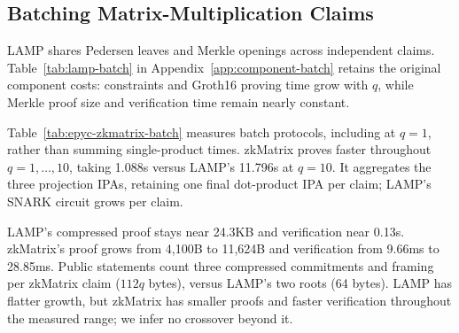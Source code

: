 \documentclass[conference,compsoc]{IEEEtran}
\makeatletter
\newif\ifshowrevisions
\newenvironment{revblock}[1][]
  {%
    \ifshowrevisions
      \begin{tcolorbox}[
        breakable,
        colback=revisionyellow,
        colframe=revisionyellow,
        boxrule=0pt,
        arc=0pt,
        left=2pt,
        right=2pt,
        top=2pt,
        bottom=2pt,
        before skip=2pt,
        after skip=2pt,
        #1
      ]
    \fi
  }
  {%
    \ifshowrevisions
      \end{tcolorbox}
    \fi
  }
\newcommand{\mat}{\mathbf}          %
\theoremstyle{plain}
\theoremstyle{definition}
\theoremstyle{remark}
\providecommand{\DIFaddtex}[1]{{\protect\color{blue}\uwave{#1}}} %
\providecommand{\DIFdeltex}[1]{{\protect\color{red}\sout{#1}}} %
\providecommand{\DIFaddbegin}{} %
\providecommand{\DIFaddend}{} %
\providecommand{\DIFdelbegin}{} %
\providecommand{\DIFdelend}{} %
\providecommand{\DIFadd}[1]{\texorpdfstring{\DIFaddtex{#1}}{#1}} %
\providecommand{\DIFdel}[1]{\texorpdfstring{\DIFdeltex{#1}}{}} %
\let\sout@orig\sout %
\renewcommand{\sout}[1]{\ifmmode\text{\sout@orig{\ensuremath{#1}}}\else\sout@orig{#1}\fi} %
\renewcommand{\DIFaddtex}[1]{{\protect\color{DiffBlue}#1}}
\renewcommand{\DIFdeltex}[1]{}
\makeatother
\begin{document}
\DIFdelend \subsection[Batching Matrix-Multiplication Claims]
  {Batching Matrix-Multiplication Claims}
\label{sec:eval-batch}
\begin{revblock}
\DIFdelbegin \DIFdel{We evaluate the batching of multiple independent claims \(\mat{A}_i\mat{B}_i=\mat{C}_i\). 
At each codeword position, the prover packs the symbols of all claims into a single Pedersen leaf and constructs one shared Merkle tree. 
Consequently, the number of Merkle membership proofs is independent of the batch size.
}%

\DIFdelend \DIFaddbegin \DIFadd{LAMP shares Pedersen leaves and Merkle openings across independent claims.
}\DIFaddend Table~\ref{tab:lamp-batch} \DIFdelbegin \DIFdel{reports the
component costs at \(k=2^7\) and \(\rho=1/2\). As the number of claims increases, the constraint count and
}\DIFdelend \DIFaddbegin \DIFadd{in Appendix~\ref{app:component-batch} retains the
original component costs: constraints and }\DIFaddend Groth16 proving time grow \DIFdelbegin \DIFdel{, while the }\DIFdelend \DIFaddbegin \DIFadd{with
\(q\), while }\DIFaddend Merkle proof size \DIFdelbegin \DIFdel{remains approximately
\(44\) KB }\DIFdelend and verification time \DIFdelbegin \DIFdel{remains approximately \(0.13\) s }\DIFdelend \DIFaddbegin \DIFadd{remain nearly constant.
}

\DIFadd{Table~\ref{tab:epyc-zkmatrix-batch} measures batch protocols, including at
\(q=1\), rather than summing single-product times. zkMatrix proves faster
throughout \(q=1,\ldots,10\), taking 1.088s versus LAMP's 11.796s at \(q=10\).
It aggregates the three projection IPAs, retaining one final dot-product IPA
per claim; LAMP's SNARK circuit grows per claim.
}

\DIFadd{LAMP's compressed proof stays near 24.3KB and verification near 0.13s.
zkMatrix's proof grows from 4,100B to 11,624B and verification from 9.66ms to
28.85ms. Public statements count three compressed commitments and framing per
zkMatrix claim (\(112q\) bytes), versus LAMP's two roots (64 bytes).
LAMP has flatter growth, but zkMatrix has smaller proofs
and faster verification throughout the measured range; we infer no crossover
beyond it}\DIFaddend .
\DIFdelbegin \DIFdel{This is
because the sampled positions and the shared Merkle openings are independent of
the number of claims; minor size variations result from shared authentication
nodes in the multi-opening implementation.
}\DIFdelend \end{revblock}
\end{document}
